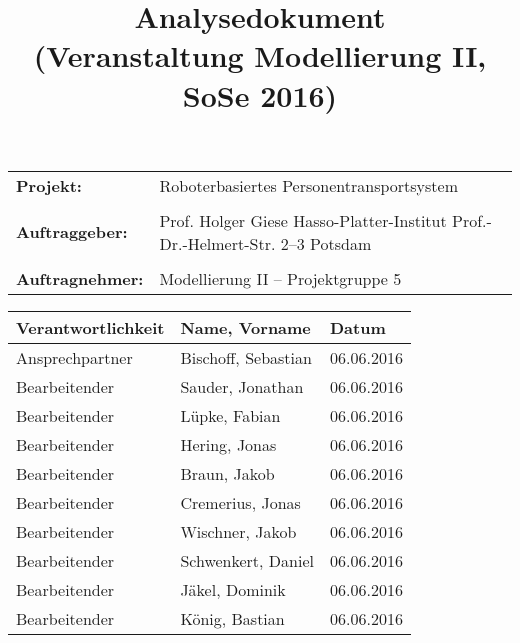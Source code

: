 \documentclass[includeheaders]{scrartcl}
\begin{document}


\newpage 

\title{Analysedokument\\ \small{(Veranstaltung Modellierung II, SoSe 2016)}}
\date{}
\author{}

\maketitle
\begin{table}[H]
	\centering
	\begin{tabular}{lp{7.5cm}}
		\textbf{Projekt:} & Roboterbasiertes Personentransportsystem\\
		&\\
		\textbf{Auftraggeber: }& Prof. Holger Giese \newline Hasso-Platter-Institut \newline Prof.-Dr.-Helmert-Str. 2–3 \newline 14482 Potsdam\\
		&\\
		\textbf{Auftragnehmer: }& Modellierung II – Projektgruppe 5 \\
	\end{tabular}
\end{table}
 
\newpage

\begin{table}[H]
	\centering
	\begin{tabularx}{\textwidth}{|p{4cm}|X|p{4cm}|}
		\hline
		Verantwortlichkeit & Name, Vorname & Datum \\ \hline
		Ansprechpartner    & Bischoff, Sebastian & 06.06.2016 \\
		Bearbeitender      & Sauder, Jonathan & 06.06.2016 \\ 
		Bearbeitender      & Lüpke, Fabian & 06.06.2016 \\ 
		Bearbeitender      & Hering, Jonas & 06.06.2016 \\
		Bearbeitender      & Braun, Jakob & 06.06.2016  \\
		Bearbeitender      & Cremerius, Jonas & 06.06.2016 \\
		Bearbeitender      & Wischner, Jakob & 06.06.2016 \\
		Bearbeitender      & Schwenkert, Daniel & 06.06.2016 \\
		Bearbeitender      & Jäkel, Dominik & 06.06.2016 \\
		Bearbeitender      & König, Bastian & 06.06.2016 \\ \hline
	\end{tabularx}
\end{table}

\newpage

\tableofcontents

\newpage








\end{document}
